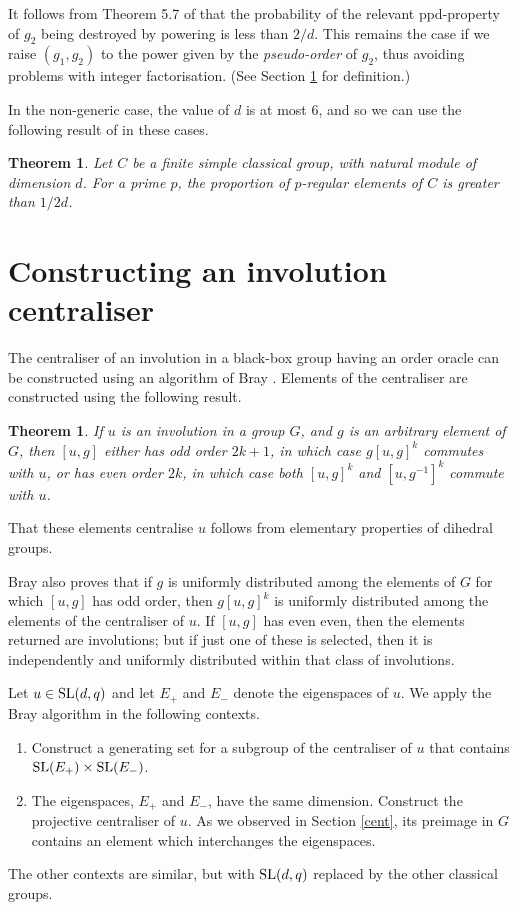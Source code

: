 \documentclass[12pt]{article}
\newtheorem{theorem}[definition]{Theorem}
\def\SL{{\rm SL}}
\begin{document}
It follows from Theorem 5.7 of \cite{NP} 
that the probability of the relevant ppd-property of $g_2$ being 
destroyed by powering is less than $2/d$.  This remains the case if 
we raise $(g_1,g_2)$ to the power given by the {\it pseudo-order} of $g_2$,
thus avoiding problems with integer factorisation. (See Section \ref{Bray}
for definition.)

In the non-generic case, the value of $d$ is at most 6,
and so we can use the following result of \cite{BPS} in these cases.
\begin{theorem}\label{bps}
Let $C$ be a finite simple classical group,
with natural module of dimension $d$.
For a prime $p$, the proportion of $p$-regular 
elements of $C$ is greater than $1/{2d}$.
\end{theorem}

\section{Constructing an involution centraliser}
\label{Bray}

The centraliser of an involution in a black-box group having an order
oracle can be constructed using an algorithm of Bray \cite{Bray}. 
Elements of the centraliser are constructed using the following result.
\begin{theorem}
\label{thm:bray}
If $u$ is an involution in a group $G$, and $g$ is an arbitrary element of $G$,
then $[u,g]$ either has odd order $2k+1$, in which case
$g[u,g]^k$ commutes with $u$, or has even order $2k$, in which case
both $[u,g]^k$ and $[u,g^{-1}]^k$ commute with $u$.
\end{theorem}
That these elements centralise $u$ follows from elementary
properties of dihedral groups. 

Bray \cite{Bray} also proves that if $g$ is uniformly
distributed among the elements of $G$ for which $[u,g]$
has odd order, then $g[u,g]^k$ is uniformly distributed among the
elements of the centraliser of $u$. If $[u,g]$ has even even, 
then the elements returned are involutions; but if just
one of these is selected, then it is independently and uniformly 
distributed within that class of involutions.

Let $u \in \SL(d, q)$ and let $E_+$ and $E_-$ denote the 
eigenspaces of $u$.
We apply the Bray algorithm in the following contexts. 
\begin{enumerate}
\item 
Construct a generating set for a subgroup of the centraliser 
of $u$ that contains $\SL(E_+)\times \SL(E_-)$. 
\item 
The eigenspaces, $E_+$ and $E_-$, have the same dimension. 
Construct the projective centraliser of $u$.
As we observed in Section \ref{cent}, its preimage in 
$G$ contains an element which interchanges the eigenspaces.
\end{enumerate}
The other contexts are similar, but with $\SL(d,q)$ 
replaced by the other classical groups. 
\end{document}
